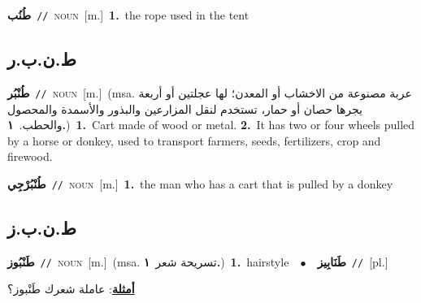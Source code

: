 \documentclass[10pt,a4paper,twoside]{article} %
\begin{document}
\begin{multicols}{2}
{\setlength\topsep{0pt}\textbf{\foreignlanguage{arabic}{طُنُب}}\ {\color{gray}\texttt{//}\color{black}}\ \textsc{noun}\ [m.]\ \textbf{1.}~the rope used in the tent\ } \vspace{2mm}

\vspace{-3mm}
\subsection*{\color{blue}\foreignlanguage{arabic}{ط.ن.ب.ر}\color{blue}{ (ntws)}} 

{\setlength\topsep{0pt}\textbf{\foreignlanguage{arabic}{طُنْبُر}}\ {\color{gray}\texttt{//}\color{black}}\ \textsc{noun}\ [m.]\ \color{gray}(msa. \foreignlanguage{arabic}{عربة مصنوعة من الاخشاب أو المعدن؛ لها عجلتين أو أربعة يجرها حصان أو حمار، تستخدم لنقل المزارعين والبذور والأسمدة والمحصول والحطب.}~\foreignlanguage{arabic}{\textbf{١.}})\color{black}\ \textbf{1.}~Cart made of wood or metal.  \textbf{2.}~It has two or four wheels pulled by a horse or donkey, used to transport farmers, seeds, fertilizers, crop and firewood.\ } \vspace{2mm}

{\setlength\topsep{0pt}\textbf{\foreignlanguage{arabic}{طُنْبُرْجِي}}\ {\color{gray}\texttt{//}\color{black}}\ \textsc{noun}\ [m.]\ \textbf{1.}~the man who has a cart that is pulled by a donkey\ } \vspace{2mm}

\vspace{-3mm}
\subsection*{\color{blue}\foreignlanguage{arabic}{ط.ن.ب.ز}\color{blue}{ (ntws)}} 

{\setlength\topsep{0pt}\textbf{\foreignlanguage{arabic}{طَنْبُوز}}\ {\color{gray}\texttt{//}\color{black}}\ \textsc{noun}\ [m.]\ \color{gray}(msa. \foreignlanguage{arabic}{تسريحة شعر}~\foreignlanguage{arabic}{\textbf{١.}})\color{black}\ \textbf{1.}~hairstyle\ \ $\bullet$\ \ \setlength\topsep{0pt}\textbf{\foreignlanguage{arabic}{طَنَابِيز}}\ {\color{gray}\texttt{//}\color{black}}\ [pl.]\  \begin{flushright}\color{gray}\foreignlanguage{arabic}{\textbf{\underline{\foreignlanguage{arabic}{أمثلة}}}: عاملة شعرك طَنْبوز؟}\end{flushright}\color{black}} \vspace{2mm}


\end{multicols}
\end{document}
